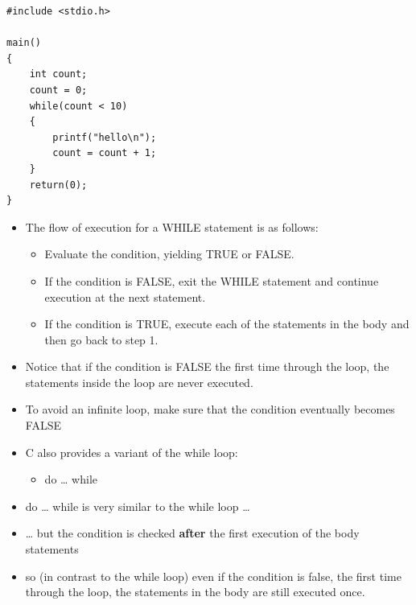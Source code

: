 \documentclass{beamer}
\begin{document}
\begin{frame}[fragile]
\begin{block}{}
\begin{lstlisting}
#include <stdio.h>

main() 
{
    int count;
    count = 0;
    while(count < 10)
    {
        printf("hello\n");
        count = count + 1;
    }
    return(0);
}

\end{lstlisting}
\end{block}
\end{frame}

 \begin{frame} 
\begin{itemize}
\item The flow of execution for a WHILE statement is as follows:
\begin{itemize}
\item Evaluate the condition, yielding TRUE or FALSE.
\item If the condition is FALSE, exit the WHILE statement and continue execution at the next statement.
\item If the condition is TRUE, execute each of the statements in the body and then go back to step 1.
\end{itemize}
\end{itemize}

\begin{itemize}
\item Notice that if the condition is FALSE the first time through the loop, the statements inside the loop are never executed.
\item To avoid an infinite loop, make sure that the condition eventually becomes FALSE
\end{itemize}
 \end{frame}

\begin{frame} 
\begin{itemize}
\item C also provides a variant of the while loop:  
\begin{itemize}
\item do {\dots} while
\end{itemize}
\item do {\dots} while is very similar to the while loop {\dots}
\item {\dots} but the condition is checked \textbf{after} the first execution of the body statements
\item so (in contrast to the while loop) even if the condition is false, the first time through the loop, the statements
in the body are still executed once. 
\end{itemize}
\end{frame}
\end{document}
